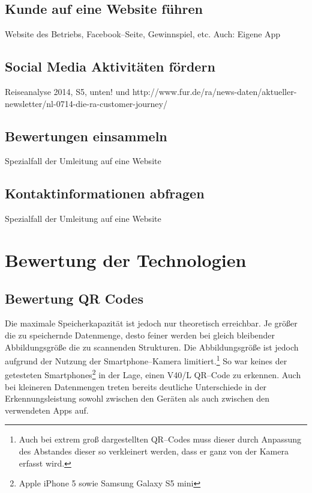 
\subsection{Kunde auf eine Website führen} %
\label{sub:kunde_auf_eine_website_fuhren}
Website des Betriebs, Facebook--Seite, Gewinnspiel, etc.
Auch: Eigene App

\subsection{Social Media Aktivitäten fördern} %
\label{sub:social_media_aktivitaten_fordern}
Reiseanalyse 2014, S5, unten! und http://www.fur.de/ra/news-daten/aktueller-newsletter/nl-0714-die-ra-customer-journey/ 

\subsection{Bewertungen einsammeln} %
\label{sub:bewertungen_einsammeln}
Spezialfall der Umleitung auf eine Website


\subsection{Kontaktinformationen abfragen} %
\label{sub:kontaktinformationen_abfragen}
Spezialfall der Umleitung auf eine Website


\newpage
\section{Bewertung der Technologien} %
\label{sec:bewertung}

\subsection{Bewertung QR Codes} %
\label{sub:bewertung_qr_codes}
Die maximale Speicherkapazität ist jedoch nur theoretisch erreichbar. Je größer die zu speichernde Datenmenge, desto feiner werden bei gleich bleibender Abbildungsgröße die zu scannenden Strukturen. Die Abbildungsgröße ist jedoch aufgrund der Nutzung der Smartphone–Kamera limitiert.\footnote{Auch bei extrem groß dargestellten QR–Codes muss dieser durch Anpassung des Abstandes dieser so verkleinert werden, dass er ganz von der Kamera erfasst wird.} So war keines der getesteten Smartphones\footnote{Apple iPhone 5 sowie Samsung Galaxy S5 mini} in der Lage, einen V40/L QR–Code zu erkennen. Auch bei kleineren Datenmengen treten bereits deutliche Unterschiede in der Erkennungsleistung sowohl zwischen den Geräten als auch zwischen den verwendeten Apps auf.

